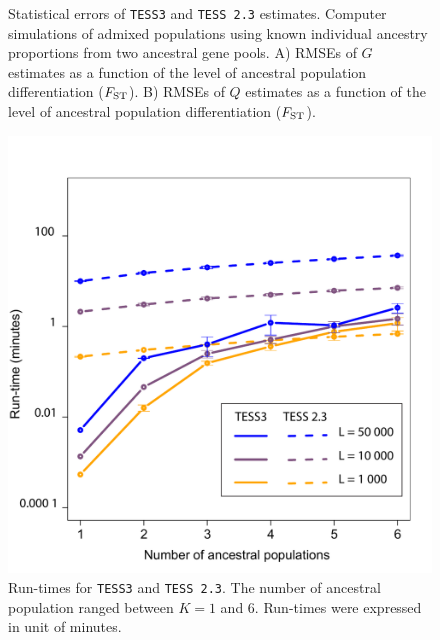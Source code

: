 \begin{figure}[h!]
\begin {minipage}{0.49\textwidth}
\end{minipage}
\caption{Statistical errors of {\tt TESS3} and {\tt TESS 2.3} estimates. Computer simulations of admixed populations using known individual ancestry proportions from two ancestral gene pools. A) RMSEs of $G$ estimates as a function of the level of ancestral population differentiation ($F_{\rm ST}$). B) RMSEs of $Q$ estimates as a function of the level of ancestral population differentiation ($F_{\rm ST}$).}
\end{figure}    

\clearpage
\newpage



\begin{figure}[h!]
  \centering

\includegraphics[width=\linewidth]{FinalGraphs/runtimes.pdf}
\caption{Run-times for {\tt TESS3} and {\tt TESS 2.3}.  The number of ancestral population ranged between $K = 1$ and $6$. Run-times were expressed in unit of minutes.}
\end{figure}

\clearpage
\newpage



